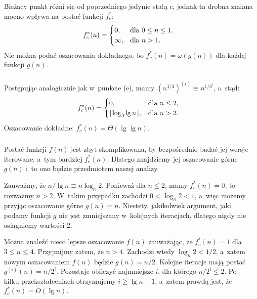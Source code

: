 \subsubsection{} %
Bieżący punkt różni się od poprzedniego jedynie stałą $c$, jednak ta drobna zmiana mocno wpływa na postać funkcji $f_c^*$:
\[
	f_c^*(n) =
	\begin{cases}
		0, & \hbox{dla }0\le n\le1, \\
		\infty, & \hbox{dla }n>1.
	\end{cases}
\]
Nie można podać oszacowania dokładnego, bo $f_c^*(n)=\omega(g(n))$ dla każdej funkcji $g(n)$.

\subsubsection{} %
Postępując analogicznie jak w~punkcie (e), mamy $\left(n^{1/3}\right)^{(i)}\equiv n^{1/3^i}$, a~stąd:
\[
	f_c^*(n) =
	\begin{cases}
		0, & \hbox{dla }n\le2, \\
		\lceil\log_3\lg n\rceil, & \hbox{dla }n>2.
	\end{cases}
\]
Oszacowanie dokładne: $f_c^*(n)=\Theta(\lg\lg n)$.

\subsubsection{} %
Postać funkcji $f(n)$ jest zbyt skomplikowana, by bezpośrednio badać jej wersje iterowane, a~tym bardziej $f_c^*(n)$. Dlatego znajdziemy jej oszacowanie górne $g(n)$ i~to ono będzie przedmiotem naszej analizy.

Zauważmy, że $n/\!\lg n\equiv n\log_n\!2$. Ponieważ dla $n\le2$, mamy $f_c^*(n)=0$, to rozważmy $n>2$. W~takim przypadku zachodzi $0<\log_n\!2<1$, a~więc możemy przyjąc oszacowanie górne $g(n)=n$. Niestety, jakikolwiek argument, jaki podamy funkcji $g$ nie jest zmniejszany w~kolejnych iteracjach, dlatego nigdy nie osiągniemy wartości 2.

Można znaleźć nieco lepsze oszacowanie $f(n)$ zauważając, że $f_c^*(n)=1$ dla $3\le n\le4$. Przyjmijmy zatem, że $n>4$. Zachodzi wtedy $\log_n\!2<1/2$, a~zatem nowym oszacowaniem $f(n)$ będzie $g(n)=n/2$. Kolejne iteracje mają postać $g^{(i)}(n)=n/2^i$. Pozostaje obliczyć najmniejsze $i$, dla którego $n/2^i\le2$. Po kilku przekształceniach otrzymujemy $i\ge\lg n-1$, a~zatem prawdą jest, że $f_c^*(n)=O(\lg n)$.
